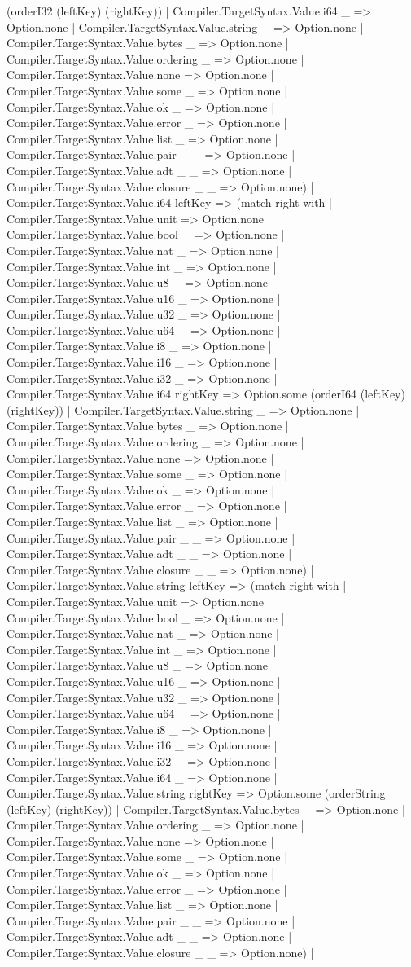 \documentclass[11pt]{article}
\begin{document}
(orderI32 (leftKey) (rightKey)) | Compiler.TargetSyntax.Value.i64 \_ => Option.none | Compiler.TargetSyntax.Value.string \_ => Option.none | Compiler.TargetSyntax.Value.bytes \_ => Option.none | Compiler.TargetSyntax.Value.ordering \_ => Option.none | Compiler.TargetSyntax.Value.none => Option.none | Compiler.TargetSyntax.Value.some \_ => Option.none | Compiler.TargetSyntax.Value.ok \_ => Option.none | Compiler.TargetSyntax.Value.error \_ => Option.none | Compiler.TargetSyntax.Value.list \_ => Option.none | Compiler.TargetSyntax.Value.pair \_ \_ => Option.none | Compiler.TargetSyntax.Value.adt \_ \_ => Option.none | Compiler.TargetSyntax.Value.closure \_ \_ => Option.none) | Compiler.TargetSyntax.Value.i64 leftKey => (match right with | Compiler.TargetSyntax.Value.unit => Option.none | Compiler.TargetSyntax.Value.bool \_ => Option.none | Compiler.TargetSyntax.Value.nat \_ => Option.none | Compiler.TargetSyntax.Value.int \_ => Option.none | Compiler.TargetSyntax.Value.u8 \_ => Option.none | Compiler.TargetSyntax.Value.u16 \_ => Option.none | Compiler.TargetSyntax.Value.u32 \_ => Option.none | Compiler.TargetSyntax.Value.u64 \_ => Option.none | Compiler.TargetSyntax.Value.i8 \_ => Option.none | Compiler.TargetSyntax.Value.i16 \_ => Option.none | Compiler.TargetSyntax.Value.i32 \_ => Option.none | Compiler.TargetSyntax.Value.i64 rightKey => Option.some (orderI64 (leftKey) (rightKey)) | Compiler.TargetSyntax.Value.string \_ => Option.none | Compiler.TargetSyntax.Value.bytes \_ => Option.none | Compiler.TargetSyntax.Value.ordering \_ => Option.none | Compiler.TargetSyntax.Value.none => Option.none | Compiler.TargetSyntax.Value.some \_ => Option.none | Compiler.TargetSyntax.Value.ok \_ => Option.none | Compiler.TargetSyntax.Value.error \_ => Option.none | Compiler.TargetSyntax.Value.list \_ => Option.none | Compiler.TargetSyntax.Value.pair \_ \_ => Option.none | Compiler.TargetSyntax.Value.adt \_ \_ => Option.none | Compiler.TargetSyntax.Value.closure \_ \_ => Option.none) | Compiler.TargetSyntax.Value.string leftKey => (match right with | Compiler.TargetSyntax.Value.unit => Option.none | Compiler.TargetSyntax.Value.bool \_ => Option.none | Compiler.TargetSyntax.Value.nat \_ => Option.none | Compiler.TargetSyntax.Value.int \_ => Option.none | Compiler.TargetSyntax.Value.u8 \_ => Option.none | Compiler.TargetSyntax.Value.u16 \_ => Option.none | Compiler.TargetSyntax.Value.u32 \_ => Option.none | Compiler.TargetSyntax.Value.u64 \_ => Option.none | Compiler.TargetSyntax.Value.i8 \_ => Option.none | Compiler.TargetSyntax.Value.i16 \_ => Option.none | Compiler.TargetSyntax.Value.i32 \_ => Option.none | Compiler.TargetSyntax.Value.i64 \_ => Option.none | Compiler.TargetSyntax.Value.string rightKey => Option.some (orderString (leftKey) (rightKey)) | Compiler.TargetSyntax.Value.bytes \_ => Option.none | Compiler.TargetSyntax.Value.ordering \_ => Option.none | Compiler.TargetSyntax.Value.none => Option.none | Compiler.TargetSyntax.Value.some \_ => Option.none | Compiler.TargetSyntax.Value.ok \_ => Option.none | Compiler.TargetSyntax.Value.error \_ => Option.none | Compiler.TargetSyntax.Value.list \_ => Option.none | Compiler.TargetSyntax.Value.pair \_ \_ => Option.none | Compiler.TargetSyntax.Value.adt \_ \_ => Option.none | Compiler.TargetSyntax.Value.closure \_ \_ => Option.none) | 
\end{document}

